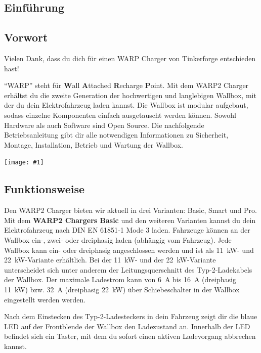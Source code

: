 \documentclass[a4paper,10pt]{article}
\newcommand{\gfx}[1]{\texttt{[image: \#1]}}
\begin{document}
\begin{multicols*}{2}
    \tableofcontents
    \newpage
    \section{Einführung}
    \subsection{Vorwort} Vielen Dank, dass du
    dich für einen WARP Charger von Tinkerforge entschieden hast!

    \enquote{WARP} steht
    für \textbf{W}all \textbf{A}ttached
    \textbf{R}echarge \textbf{P}oint. Mit dem WARP2 Charger
    erhältst du die zweite Generation der hochwertigen und langlebigen Wallbox,
    mit der du dein Elektrofahrzeug laden kannst.
    Die Wallbox ist modular aufgebaut, sodass
    einzelne Komponenten einfach ausgetauscht werden können. Sowohl Hardware als
    auch Software sind Open Source. Die nachfolgende Betriebsanleitung gibt dir
    alle notwendigen Informationen zu Sicherheit, Montage, Installation, Betrieb
    und Wartung der Wallbox.

    \gfx{./img_warp2/resized/type_2_connector_ready}\vspace{-0.3cm}

    \subsection{Funktionsweise}
    \vspace{-0.1cm}
    Den WARP2 Charger bieten wir aktuell in drei Varianten: Basic, Smart und Pro.
    Mit dem \textbf{WARP2 Chargers Basic} und den weiteren Varianten kannst du dein
    Elektrofahrzeug nach DIN EN 61851‐1 Mode 3 laden.
    Fahrzeuge können an der Wallbox ein-, zwei- oder dreiphasig laden
    (abhängig vom Fahrzeug). Jede Wallbox kann ein- oder dreiphasig
    angeschlossen werden und ist als \SI{11}{\kilo\watt}- und
    \SI{22}{\kilo\watt}-Variante erhältlich. Bei der \SI{11}{\kilo\watt}- und
    der \SI{22}{\kilo\watt}-Variante unterscheidet sich unter anderem der
    Leitungsquerschnitt des Typ-2-Ladekabels der Wallbox. Der maximale Ladestrom
    kann von \SI{6}{\ampere} bis \SI{16}{\ampere}
    (dreiphasig \SI{11}{\kilo\watt}) bzw. \SI{32}{\ampere} (dreiphasig \SI{22}{\kilo\watt}) über
    Schiebeschalter in der Wallbox eingestellt werden werden.

    \vspace{-0.1cm}
    Nach dem Einstecken des Typ-2-Ladesteckers in
    dein Fahrzeug zeigt dir die blaue LED auf der Frontblende der Wallbox den
    Ladezustand an. Innerhalb der LED befindet sich ein Taster, mit dem
    du sofort einen aktiven Ladevorgang abbrechen kannst.


\end{multicols*}
\end{document}
